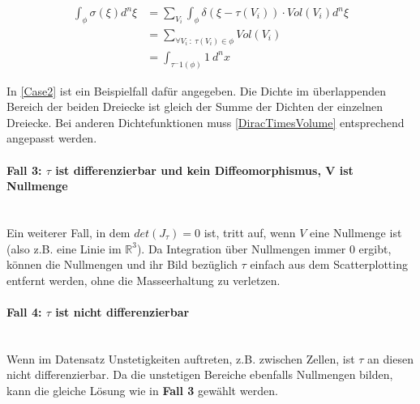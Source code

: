 \documentclass[a4paper,fontsize=12pt,toc=bib,parskip=half,ngerman]{scrartcl}
\begin{document}
\begin{equation}
\begin{split}
\int_{\phi}\sigma(\xi)d^n\xi &= \sum_{V_i}\int_{\phi}\delta(\xi - \tau(V_i)) \cdot Vol(V_i)d^n\xi\\
&= \sum_{\forall V_i~:~\tau(V_i)\in \phi} Vol(V_i)\\
&= \int_{\tau^-1(\phi)}1~d^nx
\end{split}
\end{equation}

In \cref{Case2} ist ein Beispielfall daf\"ur angegeben. Die Dichte im \"uberlappenden Bereich der beiden Dreiecke ist gleich der Summe der Dichten der einzelnen Dreiecke. Bei anderen Dichtefunktionen muss \cref{DiracTimesVolume} entsprechend angepasst werden.

\paragraph{Fall 3: $\tau$ ist differenzierbar und kein Diffeomorphismus, V ist Nullmenge}\hspace{200pt}\\
Ein weiterer Fall, in dem $det(J_\tau) = 0$ ist, tritt auf, wenn $V$ eine Nullmenge ist (also z.B. eine Linie im $\mathbb{R}^3$). Da Integration \"uber Nullmengen immer 0 ergibt, k\"onnen die Nullmengen und ihr Bild bez\"uglich $\tau$ einfach aus dem Scatterplotting entfernt werden, ohne die Masseerhaltung zu verletzen.

\paragraph{Fall 4: $\tau$ ist nicht differenzierbar}\hspace{200pt}\\
Wenn im Datensatz Unstetigkeiten auftreten, z.B. zwischen Zellen, ist $\tau$ an diesen nicht differenzierbar. Da die unstetigen Bereiche ebenfalls Nullmengen bilden, kann die gleiche L\"osung wie in \textbf{Fall 3} gew\"ahlt werden.
\end{document}
